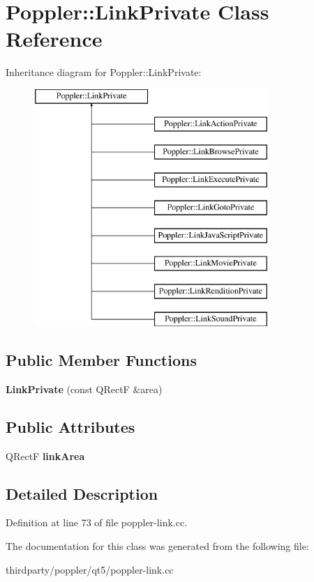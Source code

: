 \hypertarget{class_poppler_1_1_link_private}{}\section{Poppler\+:\+:Link\+Private Class Reference}
\label{class_poppler_1_1_link_private}
Inheritance diagram for Poppler\+:\+:Link\+Private\+:\begin{figure}[H]
\begin{center}
\leavevmode
\includegraphics[height=9.000000cm]{class_poppler_1_1_link_private}
\end{center}
\end{figure}
\subsection*{Public Member Functions}
\begin{DoxyCompactItemize}
\item 
\mbox{\label{class_poppler_1_1_link_private_a72f40d269a450c5db541734771fe0b91}} 
{\bfseries Link\+Private} (const Q\+RectF \&area)
\end{DoxyCompactItemize}
\subsection*{Public Attributes}
\begin{DoxyCompactItemize}
\item 
\mbox{\label{class_poppler_1_1_link_private_a95fd9b5b3a3113939462b1baecfca8fa}} 
Q\+RectF {\bfseries link\+Area}
\end{DoxyCompactItemize}


\subsection{Detailed Description}


Definition at line 73 of file poppler-\/link.\+cc.



The documentation for this class was generated from the following file\+:\begin{DoxyCompactItemize}
\item 
thirdparty/poppler/qt5/poppler-\/link.\+cc\end{DoxyCompactItemize}
